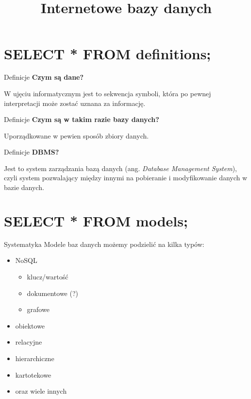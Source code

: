 

\title{Internetowe bazy danych}



\section{SELECT * FROM definitions;}

\begin{frame}{Definicje}
	\textbf{Czym są dane?}
	
	W ujęciu informatycznym jest to sekwencja symboli, która po pewnej interpretacji może zostać uznana za informację.
\end{frame}

\begin{frame}{Definicje}
	\textbf{Czym są w takim razie bazy danych?}
	
	Uporządkowane w pewien sposób zbiory danych.
\end{frame}

\begin{frame}{Definicje}
	\textbf{DBMS?}
	
	Jest to system zarządzania bazą danych (ang. \emph{Database Management System}), czyli system pozwalający między innymi na pobieranie i modyfikowanie danych w bazie danych.
\end{frame}

\section{SELECT * FROM models;}

\begin{frame}{Systematyka}
	Modele baz danych możemy podzielić na kilka typów:
	\begin{itemize}
		\item NoSQL
		\begin{itemize}
			\item klucz/wartość
			\item dokumentowe (?)
			\item grafowe
		\end{itemize}
		\item obiektowe
		\item relacyjne
		\item hierarchiczne
		\item kartotekowe
		\item oraz wiele innych
	\end{itemize}
\end{frame}

